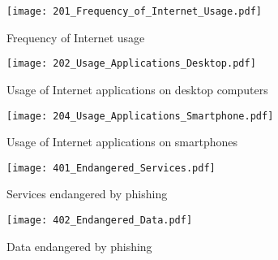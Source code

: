 \begin{figure}[h!]
 	\centering
 	\texttt{[image: 201\_Frequency\_of\_Internet\_Usage.pdf]}
 	\caption{Frequency of Internet usage}
 	\label{fig:internet_usage}
 	\end{figure}
 	\begin{figure}[h!]
 	\centering
 	\texttt{[image: 202\_Usage\_Applications\_Desktop.pdf]}%
 	\caption{Usage of Internet applications on desktop computers}%
 	\label{fig:desktop_apps}%
 	\end{figure}
 	
 	\begin{figure}[h!]
 	\centering
 	\texttt{[image: 204\_Usage\_Applications\_Smartphone.pdf]}%
 	\caption{Usage of Internet applications on smartphones}%
 	\label{fig:smartphone_apps}%
 	\end{figure}
 \begin{figure}[h!]
 \centering
 \texttt{[image: 401\_Endangered\_Services.pdf]}%
 \caption{Services endangered by phishing}%
 \label{fig:endangered_services}%
 \end{figure}
\begin{figure}[h!]
\centering
\texttt{[image: 402\_Endangered\_Data.pdf]}%
\caption{Data endangered by phishing}%
\label{fig:endangered_data}%
\end{figure}